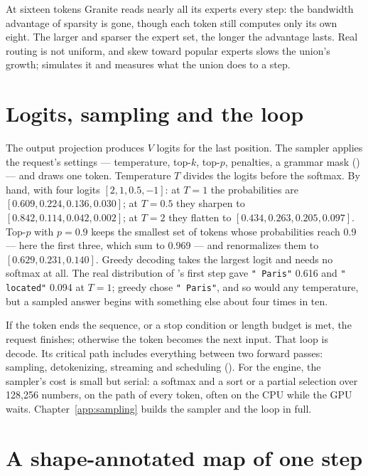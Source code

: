 \noindent At sixteen tokens Granite reads nearly all its experts every step: the
bandwidth advantage of sparsity is gone, though each token still computes only
its own eight. The larger and sparser the expert set, the longer the advantage
lasts. Real routing is not uniform, and skew toward popular experts slows the
union's growth;  simulates it and measures what the
union does to a step.

\section{Logits, sampling and the loop}

The output projection produces $V$ logits for the last position. The sampler
applies the request's settings --- temperature, top-$k$, top-$p$, penalties, a
grammar mask () --- and draws one token. Temperature
$T$ divides the logits before the softmax. By hand, with four logits
$[2, 1, 0.5, -1]$: at $T = 1$ the probabilities are
$[0.609, 0.224, 0.136, 0.030]$; at $T = 0.5$ they sharpen to
$[0.842, 0.114, 0.042, 0.002]$; at $T = 2$ they flatten to
$[0.434, 0.263, 0.205, 0.097]$. Top-$p$ with $p = 0.9$ keeps the smallest set
of tokens whose probabilities reach 0.9 --- here the first three, which sum to
0.969 --- and renormalizes them to $[0.629, 0.231, 0.140]$. Greedy decoding
takes the largest logit and needs no softmax at all. The real distribution of
's first step gave \texttt{" Paris"} 0.616 and
\texttt{" located"} 0.094 at $T = 1$; greedy chose \texttt{" Paris"}, and so
would any temperature, but a sampled answer begins with something else about
four times in ten.

If the token ends the sequence, or a stop condition or length budget is met,
the request finishes; otherwise the token becomes the next input. That loop is
decode. Its critical path includes everything between two forward passes:
sampling, detokenizing, streaming and scheduling ().
For the engine, the sampler's cost is small but serial: a softmax and a sort or
a partial selection over 128,256 numbers, on the path of every token, often on
the CPU while the GPU waits. Chapter~\ref{app:sampling} builds the sampler and
the loop in full.

\section{A shape-annotated map of one step}


